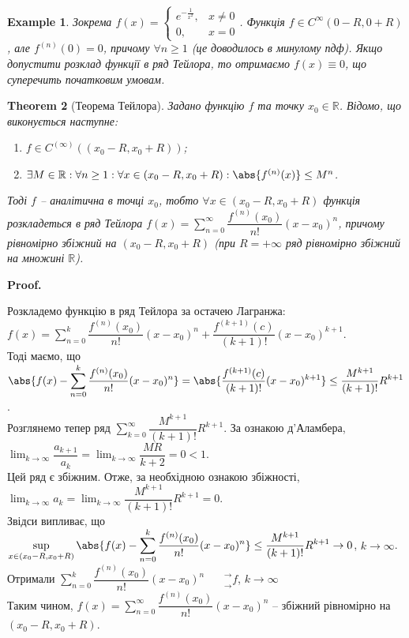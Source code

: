 \documentclass[a4paper, 10pt]{article}
\makeatletter
\def\huge{\displaystyle}
\theoremstyle{theoremdd}
\newtheorem{theorem}{Theorem}[subsection]
\theoremstyle{theoremdd}
\theoremstyle{theoremdd}
\theoremstyle{theoremdd}
\theoremstyle{theoremdd}
\newtheorem{example}[theorem]{Example}
\theoremstyle{theoremdd}
\theoremstyle{theoremdd}
\theoremstyle{theoremdd}
\theoremstyle{theoremdd}
\renewenvironment{proof}[1][Proof.\\]{\par
\pushQED{\hfill \qed}%
\normalfont \topsep6\p@\@plus6\p@\relax
\trivlist
\item\relax
{\bfseries
#1\@addpunct{.}}\hspace\labelsep\ignorespaces
}{%
\popQED\endtrivlist\@endpefalse
}
\makeatother
\begin{document}
\begin{example}
Зокрема $f(x) = \begin{cases} e^{-\frac{1}{x^2}}, & x \neq 0 \\ 0, & x = 0 \end{cases}$.  Функція $f \in C^\infty (0-R,0+R)$, але $f^{(n)}(0) = 0$, причому $\forall n \geq 1$ (це доводилось в минулому пдф). Якщо допустити розклад функції в ряд Тейлора, то отримаємо $f(x) \equiv 0$, що суперечить початковим умовам.
\end{example}

\begin{theorem}[Теорема Тейлора]
Задано функцію $f$ та точку $x_0 \in \mathbb{R}$. Відомо, що виконується наступне:
\begin{enumerate}[nosep,wide=0pt,label={\arabic*)}]
\item $f \in C^{(\infty)}((x_0-R,x_0+R))$;
\item $\exists M \in \mathbb{R}: \forall n \geq 1: \forall x \in (x_0-R, x_0+R): \abs{f^{(n)}(x)} \leq M^n$.
\end{enumerate}
Тоді $f$ -- аналітична в точці $x_0$, тобто $\forall x \in (x_0-R, x_0+R)$ функція розкладеться в ряд Тейлора $f(x) = \huge \sum_{n=0}^\infty \dfrac{f^{(n)}(x_0)}{n!}(x-x_0)^n$, причому рівномірно збіжний на $(x_0-R,x_0+R)$ (при $R = +\infty$ ряд рівномірно збіжний на множині $\mathbb{R}$).
\end{theorem}

\begin{proof}
Розкладемо функцію в ряд Тейлора за остачею Лагранжа:\\
$f(x) = \huge \sum_{n=0}^k \dfrac{f^{(n)}(x_0)}{n!}(x-x_0)^n + \dfrac{f^{(k+1)}(c)}{(k+1)!}(x-x_0)^{k+1}$.\\
Тоді маємо, що\\
$\huge \abs{f(x) - \sum_{n=0}^k \dfrac{f^{(n)}(x_0)}{n!}(x-x_0)^n} = \abs{\dfrac{f^{(k+1)}(c)}{(k+1)!}(x-x_0)^{k+1}} \leq \dfrac{M^{k+1}}{(k+1)!}R^{k+1}$.\\
Розглянемо тепер ряд $\huge \sum_{k=0}^\infty \dfrac{M^{k+1}}{(k+1)!} R^{k+1}$. За ознакою д'Аламбера, $\huge \lim_{k \to \infty} \dfrac{a_{k+1}}{a_k} = \huge \lim_{k \to \infty} \dfrac{MR}{k+2} = 0 < 1$.\\
Цей ряд є збіжним. Отже, за необхідною ознакою збіжності, $\huge \lim_{k \to \infty} a_k = \lim_{k \to \infty} \dfrac{M^{k+1}}{(k+1)!} R^{k+1} = 0$.\\
Звідси випливає, що\\
$\huge \sup_{x \in (x_0-R,x_0+R)} \abs{f(x) - \sum_{n=0}^k \dfrac{f^{(n)}(x_0)}{n!}(x-x_0)^n} \leq \dfrac{M^{k+1}}{(k+1)!}R^{k+1} \to 0$, $k \to \infty$.\\
Отримали $\huge \sum_{n=0}^k \dfrac{f^{(n)}(x_0)}{n!}(x-x_0)^n \phantom{()}^\rightarrow_\rightarrow f$, $k \to \infty$\\
Таким чином, $f(x) = \huge \sum_{n=0}^\infty \dfrac{f^{(n)}(x_0)}{n!}(x-x_0)^n$ -- збіжний рівномірно на $(x_0-R,x_0+R)$.
\end{proof}
\end{document}
